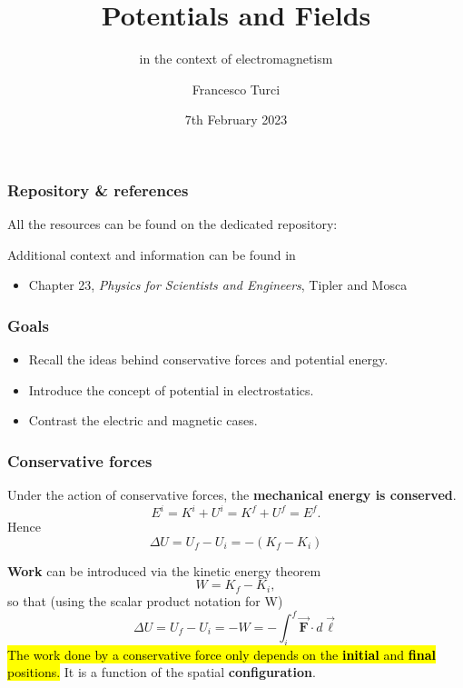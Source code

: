 \documentclass{beamer}
\title[Short Title]{Potentials and Fields}
\subtitle{in the context of electromagnetism}
\author{Francesco Turci}
\institute{School of Physics}
\date{7th February 2023}
\makeatletter
\newcommand{\vc}[1]{\vec{\boldsymbol{#1}}}
\let\HL\hl
\renewcommand\hl{%
  \let\set@color\beamerorig@set@color
  \let\reset@color\beamerorig@reset@color
  \HL}
\makeatother
\begin{document}


\begin{frame}[leftcolor=white,rightcolor=UniversityRed,div=0.8\paperwidth]
  \titlepage
\end{frame}



\begin{frame}
\frametitle{Repository \& references}
All the resources can be found on the dedicated repository:
\href{}{}


Additional context and information can be found in
\begin{itemize}
	\item Chapter 23, \textit{Physics for Scientists and Engineers}, Tipler and Mosca
\end{itemize}
	
\end{frame}

\begin{frame}
	\frametitle{Goals}
	\begin{itemize}
		\item Recall the ideas behind conservative forces and potential energy.
		\item Introduce the concept of potential in electrostatics.
		\item Contrast the electric and magnetic cases. 
	\end{itemize}
\end{frame}

\begin{frame}

\frametitle{Conservative forces}
\small

Under the action of conservative forces, the \textbf{mechanical energy is conserved}.
\begin{equation}
E^{i} = K^{i}+U^i = K^{f}+U^f= E^f.
\end{equation}
Hence
\begin{equation}
	\Delta U = U_f-U_i = - (K_f-K_i)
\end{equation}

\pause
\textbf{Work} can be introduced via the kinetic energy theorem
\begin{equation}
	W  =K_f-K_i,
\end{equation}
so that (using the scalar product notation for W)
\begin{equation}
	\Delta U = U_f-U_i = - W   = -\int_i^f \vc{F}\cdot d\vc{\ell}
\end{equation}
\pause
\hl{The work done by a conservative force only depends on the \textbf{initial} and \textbf{final} positions.} It is a function of the spatial \textbf{configuration}.
	
\end{frame}
\end{document}
